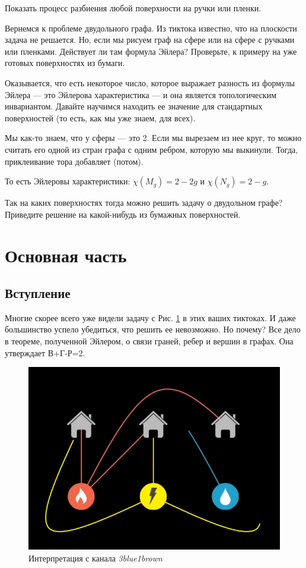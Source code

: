 \documentclass[a4paper,14pt]{extarticle}
\begin{document}
Показать процесс разбиения любой поверхности на ручки или пленки.

Вернемся к проблеме двудольного графа. Из тиктока известно, что на плоскости задача не решается. Но, если мы рисуем граф на сфере или на сфере с ручками или пленками. Действует ли там формула Эйлера? Проверьте, к примеру на уже готовых поверхностях из бумаги. 

Оказывается, что есть некоторое число, которое выражает разность из формулы Эйлера --- это Эйлерова характеристика --- и она является топологическим инвариантом. Давайте научимся находить ее значение для стандартных поверхностей (то есть, как мы уже знаем, для всех).

Мы как-то знаем, что у сферы --- это 2. Если мы вырезаем из нее круг, то можно считать его одной из стран графа с одним ребром, которую мы выкинули. Тогда, приклеивание тора добавляет (потом).

То есть Эйлеровы характеристики: $\chi(M_g) = 2-2g$ и $\chi(N_g) = 2-g$. 

Так на каких поверхностях тогда можно решить задачу о двудольном графе? Приведите решение на какой-нибудь из бумажных поверхностей.

\section{Основная часть}
\subsection{Вступление}
Многие скорее всего уже видели задачу с Рис. \ref{graph} в этих ваших тиктоках. И даже большинство успело убедиться, что решить ее невозможно. Но почему? Все дело в теореме, полученной Эйлером, о связи граней, ребер и вершин в графах. Она утверждает В+Г-Р=2.

\begin{figure}[h!]
    \centering
    \includegraphics[width=\textwidth]{graph}
    \caption{Интерпретация с канала \textit{3blue1brown}} \label{graph}
\end{figure}
\end{document}

